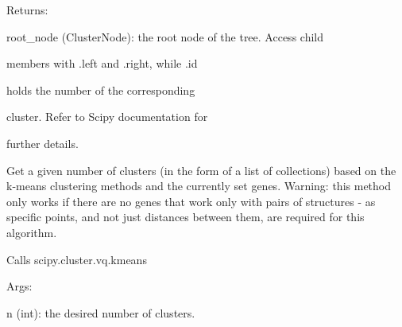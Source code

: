 \documentclass[letterpaper,10pt,english]{sphinxmanual}
\begin{document}
\begin{fulllineitems}
\begin{fulllineitems}
\begin{DUlineblock}{0em}
\item[] Returns:
\item[]
\begin{DUlineblock}{\DUlineblockindent}
\item[] root\_node (ClusterNode): the root node of the tree. Access child
\item[]
\begin{DUlineblock}{\DUlineblockindent}
\item[] members with .left and .right, while .id
\item[] holds the number of the corresponding
\item[] cluster. Refer to Scipy documentation for
\item[] further details.
\end{DUlineblock}
\end{DUlineblock}
\end{DUlineblock}

\end{fulllineitems}


\begin{fulllineitems}
\label{doctree/soprano.analyse.phylogen.phylogenclust:soprano.analyse.phylogen.phylogenclust.PhylogenCluster.get_kmeans_clusters}
Get a given number of clusters (in the form of a list of
collections) based on the k-means clustering methods
and the currently set genes.
Warning: this method only works if there are no genes that work only
with pairs of structures - as specific points, and not just distances
between them, are required for this algorithm.

Calls scipy.cluster.vq.kmeans

\begin{DUlineblock}{0em}
\item[] Args:
\item[]
\begin{DUlineblock}{\DUlineblockindent}
\item[] n (int):    the desired number of clusters.
\end{DUlineblock}
\end{DUlineblock}


\end{fulllineitems}
\end{fulllineitems}
\end{document}
